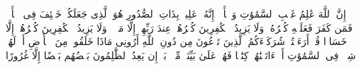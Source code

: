 \stopbuffer
\startbuffer[\q:35:38]
إِنَّ ٱللَّهَ عَٰلِمُ غَیۡبِ ٱلسَّمَٰوَٰتِ وَٱلۡأَرۡضِۚ إِنَّهُۥ عَلِیمُۢ بِذَاتِ ٱلصُّدُورِ%
\stopbuffer
\startbuffer[\q:35:39]
هُوَ ٱلَّذِی جَعَلَكُمۡ خَلَٰۤئِفَ فِی ٱلۡأَرۡضِۚ فَمَن كَفَرَ فَعَلَیۡهِ كُفۡرُهُۥۖ وَلَا یَزِیدُ ٱلۡكَٰفِرِینَ كُفۡرُهُمۡ عِندَ رَبِّهِمۡ إِلَّا مَقۡتࣰاۖ وَلَا یَزِیدُ ٱلۡكَٰفِرِینَ كُفۡرُهُمۡ إِلَّا خَسَارࣰا%
\stopbuffer
\startbuffer[\q:35:40]
قُلۡ أَرَءَیۡتُمۡ شُرَكَاۤءَكُمُ ٱلَّذِینَ تَدۡعُونَ مِن دُونِ ٱللَّهِ أَرُونِی مَاذَا خَلَقُوا۟ مِنَ ٱلۡأَرۡضِ أَمۡ لَهُمۡ شِرۡكࣱ فِی ٱلسَّمَٰوَٰتِ أَمۡ ءَاتَیۡنَٰهُمۡ كِتَٰبࣰا فَهُمۡ عَلَىٰ بَیِّنَتࣲ مِّنۡهُۚ بَلۡ إِن یَعِدُ ٱلظَّٰلِمُونَ بَعۡضُهُم بَعۡضًا إِلَّا غُرُورًا%
\stopbuffer
